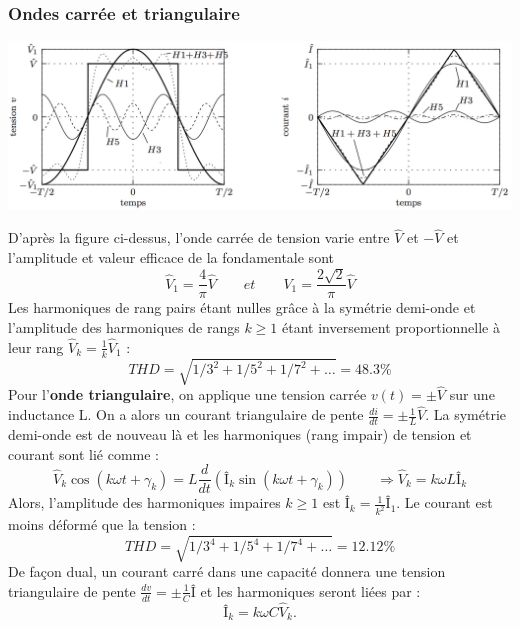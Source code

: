 		\subsubsection{Ondes carrée et triangulaire}
			\begin{center}
			\includegraphics[scale=0.4]{ch1/7}
			\end{center}
			D'après la figure ci-dessus, l'onde carrée de tension varie entre $\hat{V}$ et $-\hat{V}$ et l'amplitude et valeur efficace de la fondamentale sont 
			\begin{equation}
				\hat{V}_1 = \frac{4}{\pi}\hat{V} \qquad et \qquad V_1 = \frac{2\sqrt{2}}{\pi} \hat{V}
			\end{equation}
		   	Les harmoniques de rang pairs étant nulles grâce à la symétrie demi-onde et l'amplitude des harmoniques de rangs $k\geq 1$ étant inversement proportionnelle à leur rang $\hat{V}_k = \frac{1}{k}\hat{V}_1$ : 
		   	\begin{equation}
		   		THD = \sqrt{1/3^2 + 1/5^2+1/7^2+ \dots} = 48.3\%
		   	\end{equation}
		   	Pour l'\textbf{onde triangulaire}, on applique une tension carrée $v(t) = \pm \hat{V}$ sur une inductance L. On a alors un courant triangulaire de pente $\frac{di}{dt}= \pm \frac{1}{L}\hat{V}$. La symétrie demi-onde est de nouveau là et les harmoniques (rang impair) de tension et courant sont lié comme :
		   	\begin{equation}
		   		\hat{V}_k \cos (k\omega t+ \gamma _k) = L\frac{d}{dt}\left( Î_k \sin (k\omega t+ \gamma _k)\right)\qquad \Rightarrow  \hat{V}_k = k\omega L Î_k
			\end{equation}		   	 
			Alors, l'amplitude des harmoniques impaires $k\geq 1$ est $Î_k = \frac{1}{k^2}Î_1$. Le courant est moins déformé que la tension :
			\begin{equation}
				THD = \sqrt{1/3^4+1/5^4+1/7^4+\dots} = 12.12\%
			\end{equation}
		   	De façon dual, un courant carré dans une capacité donnera une tension triangulaire de pente $\frac{dv}{dt} = \pm \frac{1}{C}Î$ et les harmoniques seront liées par : 
		   	\begin{equation}
		   		Î_k = k\omega C \hat{V}_k.
		   	\end{equation}
		   	
